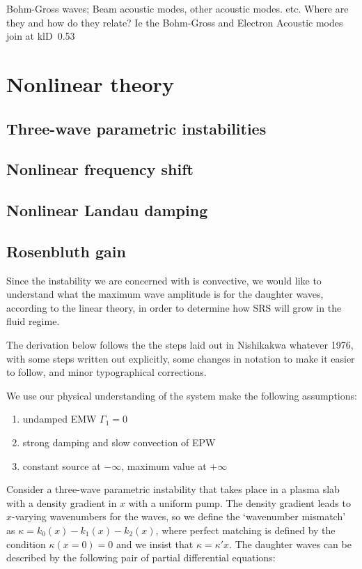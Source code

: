 Bohm-Gross waves; Beam acoustic modes, other acoustic modes.
etc. Where are they and how do they relate? Ie the Bohm-Gross and Electron
Acoustic modes join at klD~0.53

\section{Nonlinear theory}
\subsection{Three-wave parametric instabilities}
\subsection{Nonlinear frequency shift}
\subsection{Nonlinear Landau damping}

\subsection{Rosenbluth gain}

Since the instability we are concerned with is convective, we would like to understand what the maximum wave amplitude is for the daughter waves, according to the linear theory, in order to determine how SRS will grow in the fluid regime.

The derivation below follows the the steps laid out in Nishikakwa whatever 1976, with some steps written out explicitly, some changes in notation to make it easier to follow, and minor typographical corrections. 

We use our physical understanding of the system make the following assumptions:
\begin{enumerate}
	\item undamped EMW $\Gamma_1 = 0$
	\item strong damping and slow convection of EPW
	\item constant source at $-\infty$, maximum value at $+\infty$
\end{enumerate}

Consider a three-wave parametric instability that takes place in a plasma slab with a density gradient in $x$ with a uniform pump. The density gradient leads to $x$-varying wavenumbers for the waves, so we define the `wavenumber mismatch' as $\kappa = k_0(x) - k_1(x) - k_2(x)$, where perfect matching is defined by the condition $\kappa(x=0) = 0$ and we insist that $\kappa = \kappa' x$. The daughter waves can be described by the following pair of partial differential equations:

